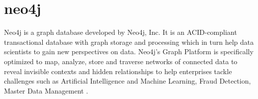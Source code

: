 \section{neo4j}
Neo4j is a graph database developed by Neo4j, Inc. It is an ACID-compliant transactional  database with graph storage and processing which in turn help data scientists to gain new perspectives on data. Neo4j’s Graph Platform is specifically optimized to map, analyze, store and traverse networks of connected data to reveal invisible contexts and hidden relationships to help enterprises tackle challenges such as Artificial Intelligence and Machine Learning, Fraud Detection, Master Data Management \cite{neo4j}.
